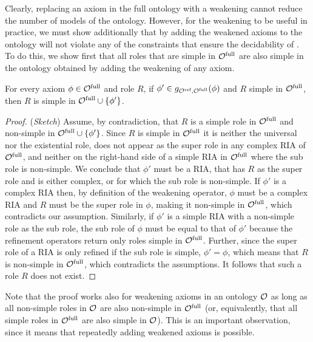 \documentclass[
]{ceurart}
\begin{document}
Clearly, replacing an axiom in the full ontology with a weakening cannot reduce the number of models of the ontology. However, for the weakening to be useful in practice, we must show additionally that by adding the weakened axioms to the ontology will not violate any of the constraints that ensure the decidability of \SROIQ. To do this, we show first that all roles that are simple in ${\mathcal{O}^\textnormal{full}}$ are also simple in the ontology obtained by adding the weakening of any axiom.

\begin{lemma} \label{lem:simple-roles}
  For every axiom $\phi \in {\mathcal{O}^\textnormal{full}}$ and role $R$, if $\phi' \in g_{{\mathcal{O}^\textnormal{ref}},{\mathcal{O}^\textnormal{full}}}(\phi)$ and $R$ simple in ${\mathcal{O}^\textnormal{full}}$, then $R$ is simple in ${\mathcal{O}^\textnormal{full}} \cup \{ \phi' \}$.
\end{lemma}

\begin{proof}(\emph{Sketch})
  Assume, by contradiction, that $R$ is a simple role in ${\mathcal{O}^\textnormal{full}}$ and non-simple in ${\mathcal{O}^\textnormal{full}} \cup \{ \phi' \}$. Since $R$ is simple in ${\mathcal{O}^\textnormal{full}}$ it is neither the universal nor the existential role, does not appear as the super role in any complex RIA of ${\mathcal{O}^\textnormal{full}}$, and neither on the right-hand side of a simple RIA in ${\mathcal{O}^\textnormal{full}}$ where the sub role is non-simple. We conclude that $\phi'$ must be a RIA, that has $R$ as the super role and is either complex, or for which the sub role is non-simple. If $\phi'$ is a complex RIA then, by definition of the weakening operator, $\phi$ must be a complex RIA and $R$ must be the super role in $\phi$, making it non-simple in ${\mathcal{O}^\textnormal{full}}$, which contradicts our assumption. Similarly, if $\phi'$ is a simple RIA with a non-simple role as the sub role, the sub role of $\phi$ must be equal to that of $\phi'$ because the refinement operators return only roles simple in ${\mathcal{O}^\textnormal{full}}$. Further, since the super role of a RIA is only refined if the sub role is simple, $\phi' = \phi$, which means that $R$ is non-simple in ${\mathcal{O}^\textnormal{full}}$, which contradicts the assumptions. It follows that such a role $R$ does not exist.
\end{proof}

Note that the proof works also for weakening axioms in an ontology $\mathcal{O}$ as long as all non-simple roles in $\mathcal{O}$ are also non-simple in ${\mathcal{O}^\textnormal{full}}$ (or, equivalently, that all simple roles in ${\mathcal{O}^\textnormal{full}}$ are also simple in $\mathcal{O}$). This is an important observation, since it means that repeatedly adding weakened axioms is possible.
\end{document}
